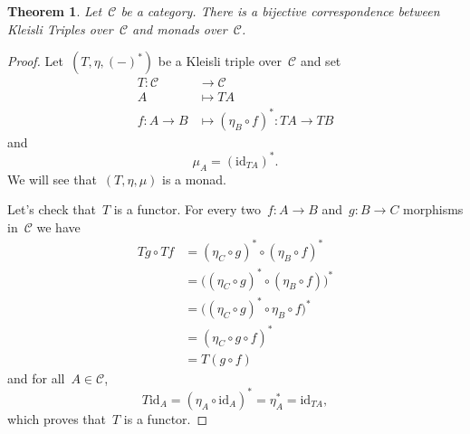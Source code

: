 \documentclass[a4paper]{article}
\theoremstyle{plain}
\newtheorem{theorem}{Theorem}[section]
\theoremstyle{definition}
\newcommand{\id}{\mathrm{id}}
\newcommand{\cat}[1]{\mathcal{#1}}
\begin{document}
\begin{theorem}
    \label{thm:kleisli-triples-and-monads-correspondence}
    Let~\(\cat{C}\) be a category.
    There is a bijective correspondence between Kleisli Triples over~\(\cat{C}\)
    and monads over~\(\cat{C}\).
\end{theorem}
\begin{proof}
    Let~\((T, \eta, (-)^{\ast})\) be a Kleisli triple over~\(\cat{C}\) and set
    \begin{equation}
        \label{eq:monad-unit-in-kleisli-trip}
        \begin{split}
            T:\cat{C} & \longrightarrow\cat{C} \\
            A & \longmapsto TA \\
            f:A\rightarrow B & \longmapsto
            (\eta_{B}\circ f)^{\ast}:TA\rightarrow TB
        \end{split}
    \end{equation}
    and
    \begin{equation}
        \label{eq:monad-prod-in-kleisli-trip}
        \mu_{A} = (\id_{TA})^{\ast}.
    \end{equation}
    We will see that~\((T,\eta,\mu)\) is a monad.

    Let's check that~\(T\) is a functor.
    For every two~\(f:A\longrightarrow B\)
    and~\(g:B\longrightarrow C\)
    morphisms in~\(\cat{C}\)
    we have
    \begin{align*}
        Tg\circ Tf &= (\eta_{C}\circ g)^{\ast}\circ
                      (\eta_{B}\circ f)^{\ast} \\
                   &= \bigl((\eta_{C}\circ g)^{\ast}\circ
                      (\eta_{B}\circ f)\bigr)^{\ast} \\
                   &= \bigl((\eta_{C}\circ g)^{\ast}\circ
                      \eta_{B}\circ f\bigr)^{\ast} \\
                   &= (\eta_{C}\circ g\circ f)^{\ast} \\
                   &= T(g\circ f)
    \end{align*}
    and for all~\(A\in\cat{C}\),
    \[
        T\id_{A} = (\eta_{A}\circ \id_{A})^{\ast} = \eta_{A}^{\ast} = \id_{TA},
    \]
    which proves that~\(T\) is a functor.


\end{proof}
\end{document}
